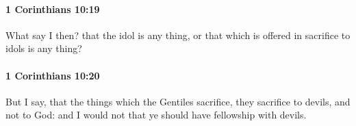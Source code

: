 		\paragraph{1 Corinthians 10:19} %
			\label{1CORINTHIANS-10-19}

			What say I then?  that the idol is any thing, or that which is offered in sacrifice to idols is any thing?

			\begin{framed}
				\scriptsize
				\begin{compactdesc}
					\item[SBLG] 
				\end{compactdesc}
			\end{framed}

		\paragraph{1 Corinthians 10:20} %
			\label{1CORINTHIANS-10-20}

			But I say, that the things which the Gentiles sacrifice, they sacrifice to devils, and not to God: and I would not that ye should have fellowship with devils.

